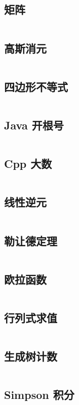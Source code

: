\documentclass[titlepage,landscape,a4paper,10pt]{article}
\begin{document}
\begin{multicols}{2}
\begin{spacing}{0.8}
\subsection{矩阵}
\inputminted{cpp}{Math/Matrix.cpp}

\subsection{高斯消元}
\inputminted{cpp}{Math/高斯消元.cpp}

\subsection{四边形不等式}
\inputminted{cpp}{Math/四边形不等式.cpp}

\subsection{Java 开根号}
\inputminted{java}{Math/Java开根号.java}

\subsection{Cpp 大数}
\inputminted{cpp}{Math/C++大数.cpp}

\subsection{线性逆元}
\inputminted{cpp}{Math/linear-inversion.cc}

\subsection{勒让德定理}
\inputminted{cpp}{Math/Legendre.cpp}

\subsection{欧拉函数}
\inputminted{cpp}{Math/欧拉函数.cpp}

\subsection{行列式求值}
\inputminted{cpp}{Math/Det.cpp}

\subsection{生成树计数}
\inputminted{cpp}{Math/生成树计数.cpp}

\subsection{Simpson 积分}
\inputminted{cpp}{Math/Simpson.cpp}



\end{spacing}
\end{multicols}
\end{document}

